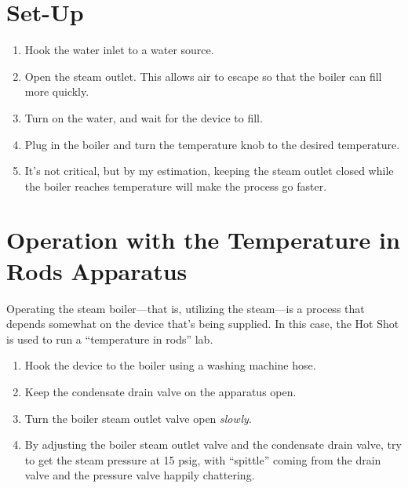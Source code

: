 \documentclass[12pt, letterpaper]{article}
\begin{document}
\section{Set-Up}

\begin{enumerate}

\item Hook the water inlet to a water source.

\item Open the steam outlet. This allows air to escape so that the boiler can fill more quickly.

\item Turn on the water, and wait for the device to fill.

\item Plug in the boiler and turn the temperature knob to the desired temperature.

\item It's not critical, but by my estimation, keeping the steam outlet closed while the boiler reaches temperature will make the process go faster.

\end{enumerate}

\section{Operation with the Temperature in Rods Apparatus}

Operating the steam boiler---that is, utilizing the steam---is a process that depends somewhat on the device that's being supplied. In this case, the Hot Shot is used to run a ``temperature in rods'' lab.

\begin{enumerate}

\item Hook the device to the boiler using a washing machine hose.

\item Keep the condensate drain valve on the apparatus open.

\item Turn the boiler steam outlet valve open \emph{slowly}.

\item By adjusting the boiler steam outlet valve and the condensate drain valve, try to get the steam pressure at 15 psig, with ``spittle'' coming from the drain valve and the pressure valve happily chattering.

\end{enumerate}
\end{document}
